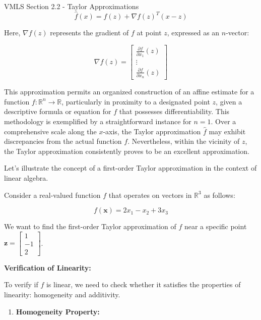 \begin{notes}{VMLS Section 2.2 - Taylor Approximations}
    \[
    \hat{f}(x) = f(z) + \nabla f(z)^T (x - z)
    \]
    
    Here, $\nabla f(z)$ represents the gradient of $f$ at point $z$, expressed as an $n$-vector:
    
    \[
    \nabla f(z) = \begin{bmatrix}
        \frac{\partial f}{\partial x_1}(z) \\
        \vdots \\
        \frac{\partial f}{\partial x_n}(z)
    \end{bmatrix}
    \]
    
    This approximation permits an organized construction of an affine estimate for a function $f : \mathbb{R}^n \to \mathbb{R}$, particularly in proximity to a designated point $z$, given a descriptive formula or equation for $f$ that possesses 
    differentiability. This methodology is exemplified by a straightforward instance for $n = 1$. Over a comprehensive scale along the $x$-axis, the Taylor approximation $\hat{f}$ may exhibit discrepancies from the actual function $f$. Nevertheless, 
    within the vicinity of $z$, the Taylor approximation consistently proves to be an excellent approximation.
    
    \begin{highlight}
        Let's illustrate the concept of a first-order Taylor approximation in the context of linear algebra.
        
        
        Consider a real-valued function \(f\) that operates on vectors in \(\mathbb{R}^3\) as follows:
        
        \[f(\mathbf{x}) = 2x_1 - x_2 + 3x_3\]
        
        We want to find the first-order Taylor approximation of \(f\) near a specific point \(\mathbf{z} = \begin{bmatrix} 1 \\ -1 \\ 2 \end{bmatrix}\).
        
        \textbf{Verification of Linearity:} \vspace*{1em}
        
        To verify if \(f\) is linear, we need to check whether it satisfies the properties of linearity: homogeneity and additivity.
        
        \begin{enumerate}
            \item \textbf{Homogeneity Property:}
            

\end{enumerate}
\end{highlight}
\end{notes}
